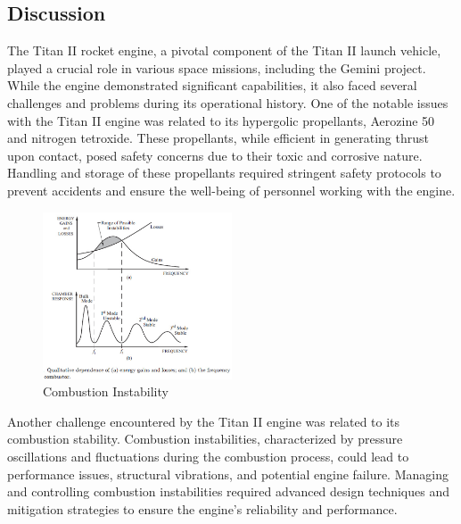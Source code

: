 \documentclass[8pt]{article} %
\begin{document}
\subsection{Discussion}
The Titan II rocket engine, a pivotal component of the Titan II launch vehicle, played a crucial role in various space missions, including the Gemini project. While the engine demonstrated significant capabilities, it also faced several challenges and problems during its operational history. 
One of the notable issues with the Titan II engine was related to its hypergolic propellants, Aerozine 50 and nitrogen tetroxide. These propellants, while efficient in generating thrust upon contact, posed safety concerns due to their toxic and corrosive nature. Handling and storage of these propellants required stringent safety protocols to prevent accidents and ensure the well-being of personnel working with the engine.\\
\begin{figure}
  \begin{center}
    \includegraphics[width=0.5\textwidth]{./lpe_freq.png}
  \end{center}
 \caption{Combustion Instability }
\label{fig:lpe_freq}
\end{figure} 
Another challenge encountered by the Titan II engine was related to its combustion stability. Combustion instabilities, characterized by pressure oscillations and fluctuations during the combustion process, could lead to performance issues, structural vibrations, and potential engine failure. Managing and controlling combustion instabilities required advanced design techniques and mitigation strategies to ensure the engine's reliability and performance.\cite{Space Launch Vehicle Complexity}\\\\
\end{document}
